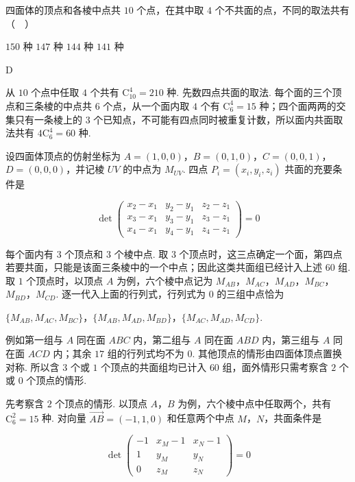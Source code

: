 \begin{problem}
四面体的顶点和各棱中点共 \(10\) 个点，在其中取 \(4\) 个不共面的点，不同的取法共有（\(\quad\)）

\choices
    {\(150\) 种}
    {\(147\) 种}
    {\(144\) 种}
    {\(141\) 种}
\end{problem}

\begin{answer}
D
\end{answer}

\begin{solution}
从 \(10\) 个点中任取 \(4\) 个共有 \(\mathrm C_{10}^{4}=210\) 种. 先数四点共面的取法. 每个面的三个顶点和三条棱的中点共 \(6\) 个点，从一个面内取 \(4\) 个有 \(\mathrm C_{6}^{4}=15\) 种；四个面两两的交集只有一条棱上的 \(3\) 个已知点，不可能有四点同时被重复计数，所以面内共面取法共有 \(4\mathrm C_{6}^{4}=60\) 种.

设四面体顶点的仿射坐标为 \(A=(1,0,0)\)，\(B=(0,1,0)\)，\(C=(0,0,1)\)，\(D=(0,0,0)\)，并记棱 \(UV\) 的中点为 \(M_{UV}\). 四点 \(P_i=(x_i,y_i,z_i)\) 共面的充要条件是

\[
\det\begin{pmatrix}
x_2-x_1&y_2-y_1&z_2-z_1\\
x_3-x_1&y_3-y_1&z_3-z_1\\
x_4-x_1&y_4-y_1&z_4-z_1
\end{pmatrix}=0
\]

每个面内有 \(3\) 个顶点和 \(3\) 个棱中点. 取 \(3\) 个顶点时，这三点确定一个面，第四点若要共面，只能是该面三条棱中的一个中点；因此这类共面组已经计入上述 \(60\) 组. 取 \(1\) 个顶点时，以顶点 \(A\) 为例，六个棱中点记为 \(M_{AB}\)，\(M_{AC}\)，\(M_{AD}\)，\(M_{BC}\)，\(M_{BD}\)，\(M_{CD}\). 逐一代入上面的行列式，行列式为 \(0\) 的三组中点恰为

\(\{M_{AB},M_{AC},M_{BC}\}\)，\(\{M_{AB},M_{AD},M_{BD}\}\)，\(\{M_{AC},M_{AD},M_{CD}\}\).

例如第一组与 \(A\) 同在面 \(ABC\) 内，第二组与 \(A\) 同在面 \(ABD\) 内，第三组与 \(A\) 同在面 \(ACD\) 内；其余 \(17\) 组的行列式均不为 \(0\). 其他顶点的情形由四面体顶点置换对称. 所以含 \(3\) 个或 \(1\) 个顶点的共面组均已计入 \(60\) 组，面外情形只需考察含 \(2\) 个或 \(0\) 个顶点的情形.

先考察含 \(2\) 个顶点的情形. 以顶点 \(A\)，\(B\) 为例，六个棱中点中任取两个，共有 \(\mathrm C_6^2=15\) 种. 对向量 \(\overrightarrow{AB}=(-1,1,0)\) 和任意两个中点 \(M\)，\(N\)，共面条件是

\[
\det\begin{pmatrix}
-1&x_M-1&x_N-1\\
1&y_M&y_N\\
0&z_M&z_N
\end{pmatrix}=0
\]


\end{solution}
